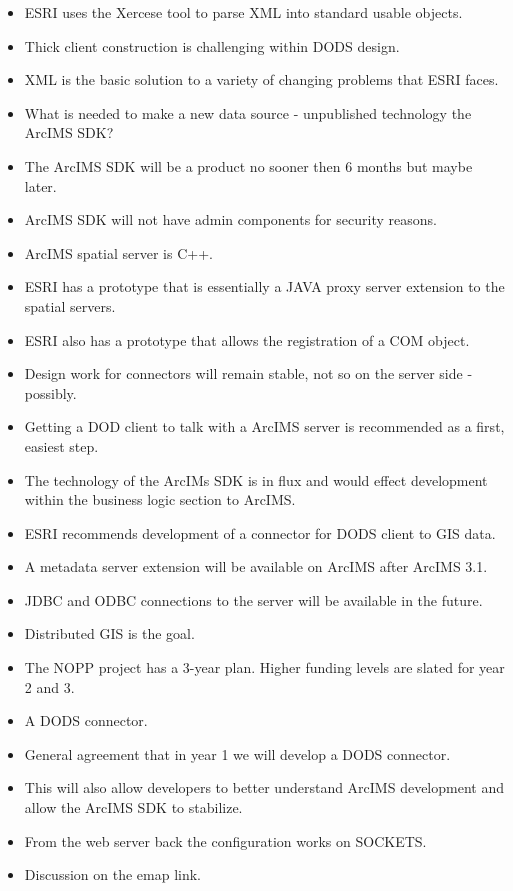 \begin{itemize}
\item ESRI uses the Xercese tool to parse XML into standard usable objects.
\item Thick client construction is challenging within DODS design.
\item XML is the basic solution to a variety of changing problems that ESRI faces.
\item What is needed to make a new data source - unpublished technology the ArcIMS SDK?
\item The ArcIMS SDK will be a product no sooner then 6 months but maybe later.
\item ArcIMS SDK will not have admin components for security reasons.
\item ArcIMS spatial server is C++.
\item ESRI has a prototype that is essentially a JAVA proxy server extension to the spatial 
servers.
\item ESRI also has a prototype that allows the registration of a COM object.
\item Design work for connectors will remain stable, not so on the server side - possibly.
\item Getting a DOD client to talk with a ArcIMS server is recommended as a first, easiest 
step.
\item The technology of the ArcIMs SDK is in flux and would effect development within the 
business logic section to ArcIMS.
\item ESRI recommends development of a connector for DODS client to GIS data.
\item A metadata server extension will be available on ArcIMS after ArcIMS 3.1.
\item JDBC and ODBC connections to the server will be available in the future.
\item Distributed GIS is the goal.
\item The NOPP project has a 3-year plan. Higher funding levels are slated for year 2 and 3.
\item A DODS connector.
\item General agreement that in year 1 we will develop a DODS connector.
\item This will also allow developers to better understand ArcIMS development and allow the 
ArcIMS SDK to stabilize.
\item From the web server back the configuration works on SOCKETS.
\item Discussion on the emap link.

\end{itemize}
